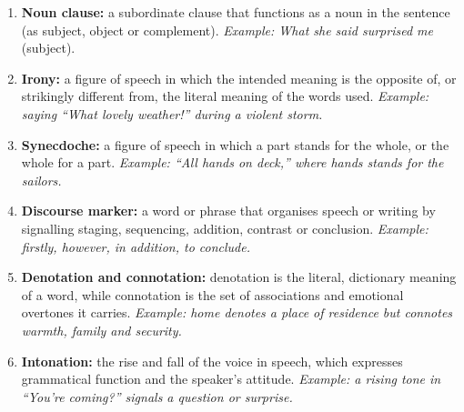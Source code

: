 \documentclass[11pt]{article}
\begin{document}
\begin{corrige}
\begin{enumerate}
\item \textbf{Noun clause:} a subordinate clause that functions as a noun in the sentence (as subject, object or complement). \emph{Example: What she said surprised me} (subject).
\item \textbf{Irony:} a figure of speech in which the intended meaning is the opposite of, or strikingly different from, the literal meaning of the words used. \emph{Example: saying ``What lovely weather!'' during a violent storm.}
\item \textbf{Synecdoche:} a figure of speech in which a part stands for the whole, or the whole for a part. \emph{Example: ``All hands on deck,'' where \emph{hands} stands for the sailors.}
\item \textbf{Discourse marker:} a word or phrase that organises speech or writing by signalling staging, sequencing, addition, contrast or conclusion. \emph{Example: \emph{firstly, however, in addition, to conclude}.}
\item \textbf{Denotation and connotation:} denotation is the literal, dictionary meaning of a word, while connotation is the set of associations and emotional overtones it carries. \emph{Example: \emph{home} denotes a place of residence but connotes warmth, family and security.}
\item \textbf{Intonation:} the rise and fall of the voice in speech, which expresses grammatical function and the speaker's attitude. \emph{Example: a rising tone in ``You're coming?'' signals a question or surprise.}
\end{enumerate}
\end{corrige}
\end{document}
